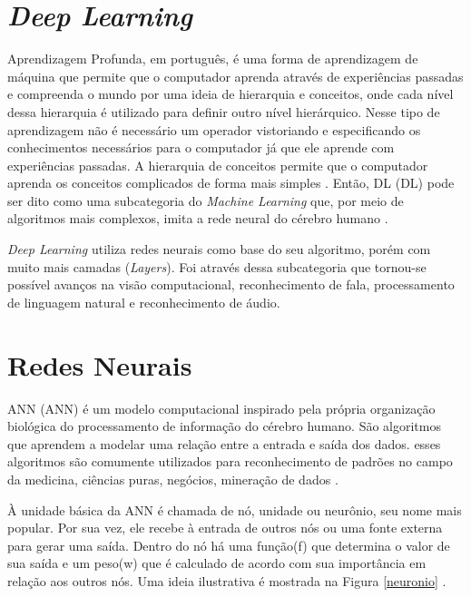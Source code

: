 \section{\textit{Deep Learning}}
\label{deep learning}

Aprendizagem Profunda, em português, é uma forma de aprendizagem de máquina que permite que o computador aprenda através de experiências passadas e compreenda o mundo por uma ideia de hierarquia e conceitos, onde cada nível dessa hierarquia é utilizado para definir outro nível hierárquico. Nesse tipo de aprendizagem não é necessário um operador vistoriando e especificando os conhecimentos necessários para o computador já que ele aprende com experiências passadas. A hierarquia de conceitos permite que o computador aprenda os conceitos complicados de forma mais simples \cite{goodfellow2016deep}. Então, \acrlong{DL} (DL) pode ser dito como uma subcategoria do \textit{Machine Learning} que, por meio de algoritmos mais complexos, imita a rede neural do cérebro humano \cite{diferencamachinelearning}.

\textit{Deep Learning} utiliza redes neurais como base do seu algoritmo, porém com muito mais camadas (\textit{Layers}). Foi através dessa subcategoria que tornou-se possível avanços na visão computacional, reconhecimento de fala, processamento de linguagem natural e reconhecimento de áudio.

\section{Redes Neurais}
\label{redes neurais}

\acrlong{ANN} (ANN) é um modelo computacional inspirado pela própria organização biológica do processamento de informação do cérebro humano. São algoritmos que aprendem a modelar uma relação entre a entrada e saída dos dados. esses algoritmos são comumente utilizados para reconhecimento de padrões no campo da medicina, ciências puras, negócios, mineração de dados \cite{redeneuralnvidia}.

À unidade básica da ANN é chamada de nó, unidade ou neurônio, seu nome mais popular. Por sua vez, ele recebe à entrada de outros nós ou uma fonte externa para gerar uma saída. Dentro do nó há uma função(f) que determina o valor de sua saída e um peso(w) que é calculado de acordo com sua importância em relação aos outros nós. Uma ideia ilustrativa é mostrada na Figura \ref{neuronio} \cite{conv2,redeneuralnvidia}.

